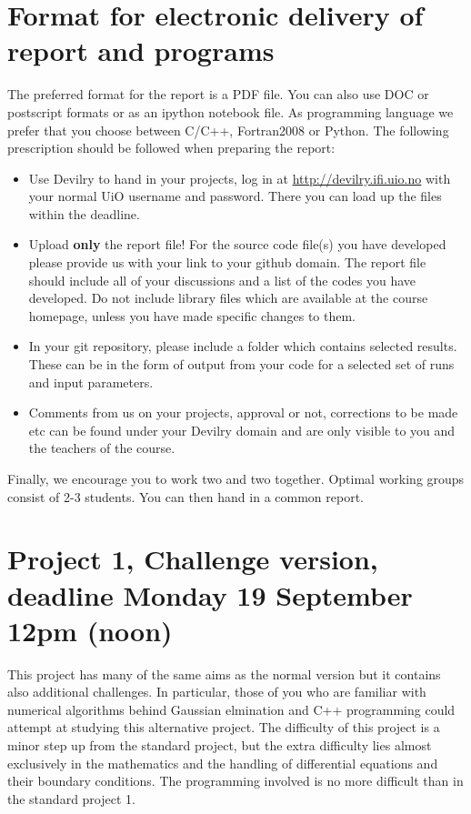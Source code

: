 \documentclass[11pt,a4wide]{article}
\begin{document}
\section*{Format for electronic delivery of report and programs}
%
The preferred format for the report is a PDF file. You can also
use DOC or postscript formats or as an ipython notebook file. 
As programming language we prefer that you choose between C/C++, Fortran2008 or Python.
The following prescription should be followed when preparing the report:
\begin{itemize}
\item Use Devilry to hand in your projects, log in  at 
\url{ http://devilry.ifi.uio.no} with your normal UiO username and password.
There you can load up the files within the deadline.
\item Upload {\bf only} the report file!  For the source code file(s) you have developed please provide us with your link to your github domain. 
The report file should include all of your discussions and a list of the codes you have developed. 
Do not include library files which are available at the course homepage, unless you have
made specific changes to them.
\item In your git repository, please include a folder which contains selected results. These can be in the form of output from your code
for a selected set of runs and input parameters. 
\item Comments  from us on your projects, approval or not, corrections to be made 
etc can be found under
your Devilry domain and are only visible to you and the teachers of the course.

\end{itemize}

Finally, 
we encourage you to work two and two together. Optimal working groups consist of 
2-3 students. You can then hand in a common report. 

\section*{Project 1, Challenge version, deadline Monday 19 September 12pm (noon)}

This project has many of the same aims as the normal version but it
contains also additional challenges.  In particular, those of you who
are familiar with numerical algorithms behind Gaussian elmination and C++ programming could
attempt at studying this alternative project.
The difficulty of this project is a minor step up from
the standard project, but the extra difficulty lies almost exclusively
in the mathematics and the handling of differential equations and
their boundary conditions. The programming involved is no
more difficult than in the standard project 1.
\end{document}
